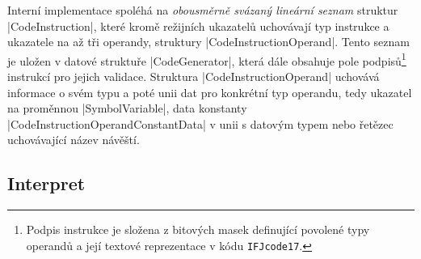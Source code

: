 Interní implementace spoléhá na \emph{obousměrně svázaný lineární seznam} struktur \ic|CodeInstruction|, které kromě
režijních ukazatelů uchovávají typ instrukce a ukazatele na až tři operandy, struktury \ic|CodeInstructionOperand|.
Tento seznam je uložen v datové struktuře \ic|CodeGenerator|, která dále obsahuje pole podpisů\footnote{Podpis
instrukce je složena z bitových masek definující povolené typy operandů a její textové reprezentace v kódu
\texttt{IFJcode17}.} instrukcí pro jejich validace.
Struktura \ic|CodeInstructionOperand| uchovává informace o svém typu a poté unii dat pro konkrétní typ operandu, tedy
ukazatel na proměnnou \ic|SymbolVariable|,
data konstanty \ic|CodeInstructionOperandConstantData| v unii s datovým typem nebo řetězec uchovávající název návěští.

\subsection{Interpret}
